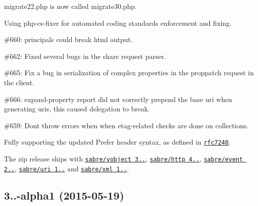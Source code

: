 \begin{DoxyItemize}
\item {\ttfamily migrate22.\+php} is now called {\ttfamily migrate30.\+php}.
\item Using php-\/cs-\/fixer for automated coding standards enforcement and fixing.
\item \#660\+: principals could break html output.
\item \#662\+: Fixed several bugs in the {\ttfamily share} request parser.
\item \#665\+: Fix a bug in serialization of complex properties in the proppatch request in the client.
\item \#666\+: expand-\/property report did not correctly prepend the base uri when generating uris, this caused delegation to break.
\item \#659\+: Don\textquotesingle{}t throw errors when when etag-\/related checks are done on collections.
\item Fully supporting the updated {\ttfamily Prefer} header syntax, as defined in \href{http://tools.ietf.org/html/rfc7240}{\tt rfc7240}.
\item The zip release ships with \href{http://sabre.io/vobject/}{\tt sabre/vobject 3..}, \href{http://sabre.io/http/}{\tt sabre/http 4..}, \href{http://sabre.io/event/}{\tt sabre/event 2..}, \href{http://sabre.io/uri/}{\tt sabre/uri 1..} and \href{http://sabre.io/xml/}{\tt sabre/xml 1..}.
\end{DoxyItemize}

\subsection*{3..-\/alpha1 (2015-\/05-\/19) }



